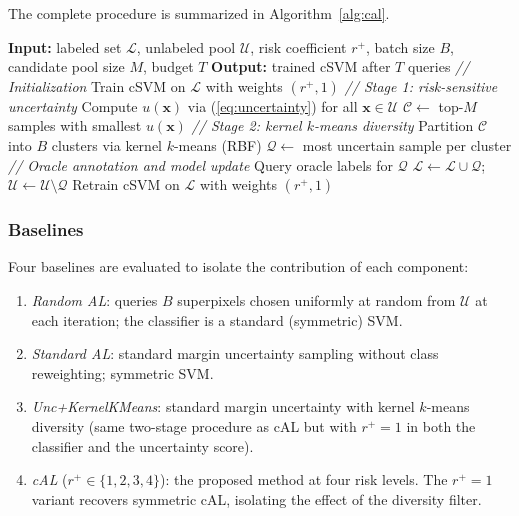 \documentclass[lettersize,journal]{IEEEtran}
\begin{document}
The complete procedure is summarized in Algorithm~\ref{alg:cal}.

\begin{algorithm}[t]
\caption{Cost-Sensitive Active Learning (cAL)}
\label{alg:cal}
\begin{algorithmic}
\STATE \textbf{Input:} labeled set $\mathcal{L}$, unlabeled pool
       $\mathcal{U}$, risk coefficient $r^{+}$, batch size $B$,
       candidate pool size $M$, budget $T$
\STATE \textbf{Output:} trained cSVM after $T$ queries
\STATE
\STATE \textit{// Initialization}
\STATE Train cSVM on $\mathcal{L}$ with weights $(r^{+}, 1)$
\STATE
{}
    \STATE \textit{// Stage 1: risk-sensitive uncertainty}
    \STATE Compute $u(\mathbf{x})$ via (\ref{eq:uncertainty})
           for all $\mathbf{x} \in \mathcal{U}$
    \STATE $\mathcal{C} \leftarrow$ top-$M$ samples with smallest
           $u(\mathbf{x})$
    \STATE
    \STATE \textit{// Stage 2: kernel $k$-means diversity}
    \STATE Partition $\mathcal{C}$ into $B$ clusters via kernel
           $k$-means (RBF)
    \STATE $\mathcal{Q} \leftarrow$ most uncertain sample per cluster
    \STATE
    \STATE \textit{// Oracle annotation and model update}
    \STATE Query oracle labels for $\mathcal{Q}$
    \STATE $\mathcal{L} \leftarrow \mathcal{L} \cup \mathcal{Q}$;
           $\mathcal{U} \leftarrow \mathcal{U} \setminus \mathcal{Q}$
    \STATE Retrain cSVM on $\mathcal{L}$ with weights $(r^{+}, 1)$
\ENDWHILE
\end{algorithmic}
\end{algorithm}

\subsubsection{Baselines}

Four baselines are evaluated to isolate the contribution of each
component:

\begin{enumerate}
    \item \textit{Random AL}: queries $B$ superpixels chosen uniformly
          at random from $\mathcal{U}$ at each iteration; the
          classifier is a standard (symmetric) SVM.
    \item \textit{Standard AL}: standard margin uncertainty sampling
          without class reweighting; symmetric SVM.
    \item \textit{Unc+KernelKMeans}: standard margin uncertainty
          with kernel $k$-means diversity (same two-stage procedure
          as cAL but with $r^{+} = 1$ in both the classifier and
          the uncertainty score).
    \item \textit{cAL} ($r^{+} \in \{1, 2, 3, 4\}$): the proposed
          method at four risk levels. The $r^{+} = 1$ variant
          recovers symmetric cAL, isolating the effect of the
          diversity filter.
\end{enumerate}
\end{document}
